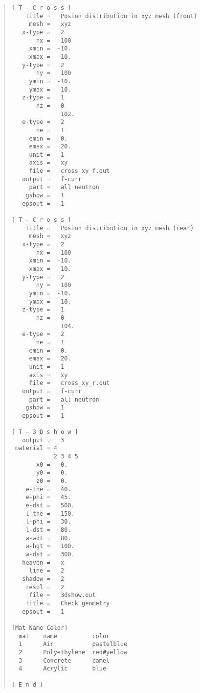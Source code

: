 \documentclass[../master]{subfiles}
\begin{document}
\begin{quote}
\begin{verbatim}
[ T - C r o s s ]
    title =   Posion distribution in xyz mesh (front)
     mesh =   xyz
   x-type =   2
       nx =   100
     xmin =  -10.
     xmax =   10.
   y-type =   2
       ny =   100
     ymin =  -10.
     ymax =   10.
   z-type =   1
       nz =   0
              102.
   e-type =   2
       ne =   1
     emin =   0.
     emax =   20.
     unit =   1 
     axis =   xy
     file =   cross_xy_f.out
   output =   f-curr
     part =   all neutron
    gshow =   1
   epsout =   1

[ T - C r o s s ]
    title =   Posion distribution in xyz mesh (rear)
     mesh =   xyz
   x-type =   2
       nx =   100
     xmin =  -10.
     xmax =   10.
   y-type =   2
       ny =   100
     ymin =  -10.
     ymax =   10.
   z-type =   1
       nz =   0
              104.
   e-type =   2
       ne =   1
     emin =   0.
     emax =   20.
     unit =   1 
     axis =   xy
     file =   cross_xy_r.out
   output =   f-curr
     part =   all neutron
    gshow =   1
   epsout =   1

[ T - 3 D s h o w ]
   output =   3
 material = 4
            2 3 4 5
       x0 =   0.
       y0 =   0.
       z0 =   0.
    e-the =   40.
    e-phi =   45.
    e-dst =   500.
    l-the =   150.
    l-phi =   30.
    l-dst =   80.
    w-wdt =   80.
    w-hgt =   100.
    w-dst =   300.
   heaven =   x
     line =   2
   shadow =   2
    resol =   2
     file =   3dshow.out
    title =   Check geometry
   epsout =   1

[Mat Name Color]
  mat    name          color
  1      Air           pastelblue
  2      Polyethylene  red#yellow
  3      Concrete      camel
  4      Acrylic       blue

[ E n d ]
\end{verbatim}
\end{quote}
\end{document}
